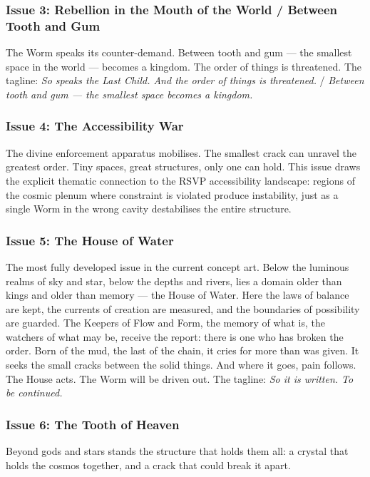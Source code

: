 \documentclass[12pt, a4paper]{article}
\begin{document}
\subsubsection{Issue 3: Rebellion in the Mouth of the World / Between Tooth and Gum}

The Worm speaks its counter-demand. Between tooth and gum --- the smallest space in the world --- becomes a kingdom. The order of things is threatened. The tagline: \textit{So speaks the Last Child. And the order of things is threatened.} / \textit{Between tooth and gum --- the smallest space becomes a kingdom.}

\subsubsection{Issue 4: The Accessibility War}

The divine enforcement apparatus mobilises. The smallest crack can unravel the greatest order. Tiny spaces, great structures, only one can hold. This issue draws the explicit thematic connection to the RSVP accessibility landscape: regions of the cosmic plenum where constraint is violated produce instability, just as a single Worm in the wrong cavity destabilises the entire structure.

\subsubsection{Issue 5: The House of Water}

The most fully developed issue in the current concept art. Below the luminous realms of sky and star, below the depths and rivers, lies a domain older than kings and older than memory --- the House of Water. Here the laws of balance are kept, the currents of creation are measured, and the boundaries of possibility are guarded. The Keepers of Flow and Form, the memory of what is, the watchers of what may be, receive the report: there is one who has broken the order. Born of the mud, the last of the chain, it cries for more than was given. It seeks the small cracks between the solid things. And where it goes, pain follows. The House acts. The Worm will be driven out. The tagline: \textit{So it is written. To be continued.}

\subsubsection{Issue 6: The Tooth of Heaven}

Beyond gods and stars stands the structure that holds them all: a crystal that holds the cosmos together, and a crack that could break it apart.
\end{document}
